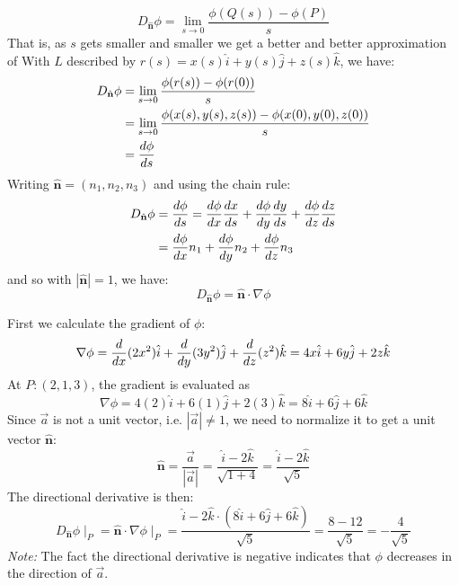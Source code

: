 \documentclass[a4paper, 10pt]{article}
\begin{document}
$$D_{\hat{\mathbf{n}}} \phi = \lim_{s \to 0} \frac{\phi(Q(s)) - \phi(P)}{s}$$
That is, as $s$ gets smaller and smaller we get a better and better approximation of
With $L$ described by $r(s) = x(s) \hat{i} + y(s) \hat{j} + z(s) \hat{k}$, we have:
\begin{align*}
  D_{\hat{\mathbf{n}}} \phi & = \lim_{s \to 0} \frac{\phi(r(s)) - \phi(r(0))}{s}                         \\
                            & = \lim_{s \to 0} \frac{\phi(x(s), y(s), z(s)) - \phi(x(0), y(0), z(0))}{s} \\
                            & = \frac{d\phi}{ds}
\end{align*}
Writing $\hat{\mathbf{n}} = (n_1, n_2, n_3)$ and using the chain rule:
\begin{align}
  D_{\hat{\mathbf{n}}} \phi & = \frac{d\phi}{ds} = \frac{d\phi}{dx} \frac{dx}{ds} + \frac{d\phi}{dy} \frac{dy}{ds} + \frac{d\phi}{dz} \frac{dz}{ds} \nonumber \\
                            & = \frac{d\phi}{dx} n_1 + \frac{d\phi}{dy} n_2 + \frac{d\phi}{dz} n_3
\end{align}
and so with $|\hat{\mathbf{n}}| = 1$, we have:
$$D_{\hat{\mathbf{n}}} \phi = \hat{\mathbf{n}} \cdot \nabla \phi $$

\begin{examplebox}[Find the directional derivative of $\phi(x,y,z) = 2x^2 + 3y^2 + z^2$ at the point
    $P: : (2,1,3)$ in the direction of the vector $\vec{a} = \hat{i} - 2\hat{k}$]
  First we calculate the gradient of $\phi$:
  $$\nabla \phi = \frac{d}{dx}(2x^2) \hat{i} + \frac{d}{dy}(3y^2) \hat{j} + \frac{d}{dz}(z^2) \hat{k} = 4x \hat{i} + 6y \hat{j} + 2z \hat{k}$$
  At $P : (2,1,3)$, the gradient is evaluated as
  $$\nabla \phi = 4(2) \hat{i} + 6(1) \hat{j} + 2(3) \hat{k} = 8 \hat{i} + 6 \hat{j} + 6 \hat{k}$$
  Since $\vec{a}$ is not a unit vector, i.e. $|\vec{a}| \neq 1$, we need to normalize it to get a unit vector $\hat{\mathbf{n}}$:
  $$\hat{\mathbf{n}} = \frac{\vec{a}}{|\vec{a}|} = \frac{\hat{i} - 2\hat{k}}{\sqrt{1 + 4}} = \frac{\hat{i} - 2\hat{k}}{\sqrt{5}}$$
  The directional derivative is then:
  $$D_{\hat{\mathbf{n}}} \phi \mid_P = \hat{\mathbf{n}} \cdot \nabla \phi\mid_P = \frac{\hat{i} - 2\hat{k} \cdot (8\hat{i} + 6\hat{j} + 6\hat{k})}{\sqrt{5}} = \frac{8 - 12}{\sqrt{5}} = -\frac{4}{\sqrt{5}}$$
  \emph{Note:} The fact the directional derivative is negative indicates that $\phi$ decreases in the direction of $\vec{a}$.
\end{examplebox}
\end{document}

